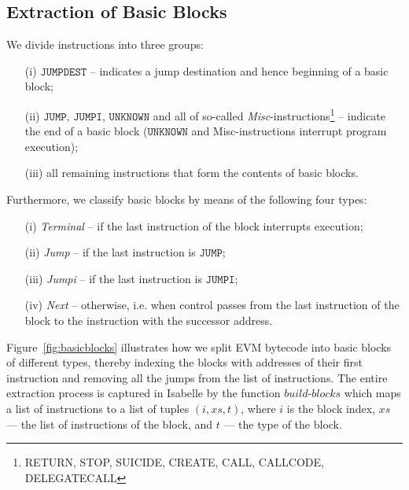 \documentclass[sigplan,10pt,review]{acmart}\settopmatter{printfolios=true,printccs=false,printacmref=false}
\newcommand{\instr}[1]{\mathtt{#1}}
\newcommand{\bblocks}{\mathit{build\mbox{-}blocks}}
\begin{document}
\subsection{Extraction of Basic Blocks}
We divide instructions into three groups:
\begin{itemize}
\item[(i)] $\instr{JUMPDEST}$ -- indicates a jump destination and hence beginning of a
                                 basic block;
\item[(ii)] $\instr{JUMP}$, $\instr{JUMPI}$, $\instr{UNKNOWN}$ and all of so-called 
            \emph{Misc}-instructions\footnote{RETURN, STOP, SUICIDE, CREATE, CALL, CALLCODE, DELEGATECALL} --
            indicate the end of a basic block ($\instr{UNKNOWN}$ and Misc-instructions interrupt program execution); 
\item[(iii)] all remaining instructions that form the contents of basic blocks.
\end{itemize}  
Furthermore, we classify basic blocks by means of the following four types:
\begin{itemize}
\item[(i)] \textit{Terminal} -- if the last instruction of the block interrupts execution;
\item[(ii)] \textit{Jump} -- if the last instruction is $\instr{JUMP}$;
\item[(iii)] \textit{Jumpi} -- if the last instruction is $\instr{JUMPI}$;
\item[(iv)] \textit{Next} -- otherwise, i.e. when control passes from the last instruction of the block
                             to the instruction with the successor address.                         
\end{itemize} 
Figure~\ref{fig:basicblocks} illustrates how we split EVM bytecode into basic blocks of different
types, thereby indexing the blocks with addresses of their first instruction
and removing all the jumps from the list of instructions.
The entire extraction process is captured in Isabelle
by the function $\bblocks$ which maps a list of instructions to a list of tuples $(i, \mathit{xs}, t)$,
where $i$ is the block index, $\mathit{xs}$ --- the list of instructions of the block, and $t$ --- the type of
the block. 
\end{document}
